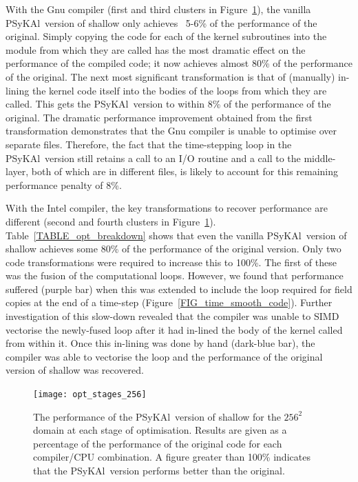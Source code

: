 \documentclass[journal]{IEEEtran}
\newcommand{\psykal}{{PS}y{KA}l\ }
\begin{document}
With the Gnu compiler (first and third clusters in
Figure~\ref{FIG_opt_stages_256}), the vanilla \psykal version of
shallow only achieves ~5-6\% of the performance of the
original. Simply copying the code for each of the kernel subroutines
into the module from which they are called has the most dramatic
effect on the performance of the compiled code; it now achieves almost
80\% of the performance of the original. The next most significant
transformation is that of (manually) in-lining the kernel code itself
into the bodies of the loops from which they are called. This gets the
\psykal version to within 8\% of the performance of the original.  The
dramatic performance improvement obtained from the first
transformation demonstrates that the Gnu compiler is unable to
optimise over separate files. Therefore, the fact that the
time-stepping loop in the \psykal version still retains a call to an
I/O routine and a call to the middle-layer, both of which are in
different files, is likely to account for this remaining performance
penalty of 8\%.

With the Intel compiler, the key transformations to recover
performance are different (second and fourth clusters in
Figure~\ref{FIG_opt_stages_256}).  Table~\ref{TABLE_opt_breakdown}
shows that even the vanilla \psykal version of shallow achieves some
80\% of the performance of the original version. Only two code
transformations were required to increase this to 100\%. The first of
these was the fusion of the computational loops. However, we found
that performance suffered (purple bar) when this was extended to
include the loop required for field copies at the end of a time-step
(Figure~\ref{FIG_time_smooth_code}). Further investigation of this
slow-down revealed that the compiler was unable to SIMD vectorise the
newly-fused loop after it had in-lined the body of the kernel called
from within it. Once this in-lining was done by hand (dark-blue bar),
the compiler was able to vectorise the loop and the performance of the
original version of shallow was recovered.

\begin{figure}[!t]
\centering
\texttt{[image: opt\_stages\_256]}
\caption{The performance of the \psykal version of shallow for the
  $256^{2}$ domain at each stage of optimisation. Results are given as
  a percentage of the performance of the original code for each
  compiler/CPU combination. A figure greater than 100\% indicates that
  the \psykal version performs better than the original.}
\label{FIG_opt_stages_256}
\end{figure}
\end{document}
